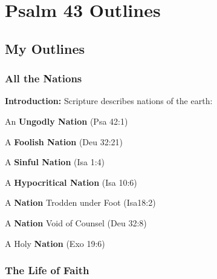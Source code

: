 \section{Psalm 43 Outlines}

\subsection{My Outlines}

\subsubsection{All the Nations}
\textbf{Introduction:} Scripture describes nations of the earth:

\begin{compactenum}[I.][7]
    \item An \textbf{Ungodly Nation} (Psa 42:1)
    \item A \textbf{Foolish Nation} (Deu 32:21)
    \item A \textbf{Sinful Nation} (Isa 1:4)
    \item A \textbf{Hypocritical Nation} (Isa 10:6)
    \item A \textbf{Nation} Trodden under Foot (Isa18:2)
    \item A \textbf{Nation} Void of Counsel (Deu 32:8)
    \item A Holy \textbf{Nation}  (Exo 19:6)
\end{compactenum} 

\subsubsection{The Life of Faith}

